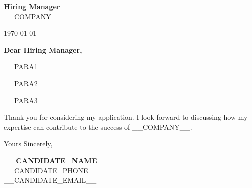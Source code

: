 \documentclass[11pt,a4paper]{article}
\begin{document}
\begin{minipage}[t]{0.6\textwidth}
  \vspace{0pt}
  \color{color0}
  \textbf{Hiring Manager} \\
  __COMPANY__
\end{minipage}%
\begin{minipage}[t]{0.4\textwidth}
  \vspace{0pt}
  \raggedleft \color{color2}
  \today
\end{minipage}

\vspace{1.5em}

{\color{color0}
\textbf{Dear Hiring Manager,}

\vspace{1em}

__PARA1__

\vspace{1em}

__PARA2__

\vspace{1em}

__PARA3__

\vspace{1em}

Thank you for considering my application. I look forward to discussing how my expertise can contribute to the success of __COMPANY__.

\vspace{1.5em}

Yours Sincerely,

\vspace{1.5em}

\textbf{__CANDIDATE_NAME__} \\
     __CANDIDATE_PHONE__ \\
     __CANDIDATE_EMAIL__
}
\end{document}
